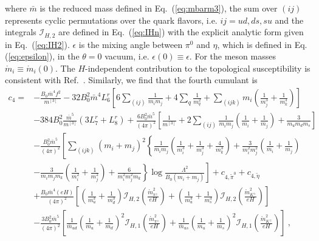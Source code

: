 \documentclass[12pt]{elsarticle}
\begin{document}
where $\bar{m}$ is the reduced mass defined in Eq.~(\ref{eq:mbarm3}), the sum over $(ij)$ represents cyclic permutations over the quark flavors, i.e. $ij=ud,ds,su$ and the integrals $\mathcal{I}_{H,2}$ are defined in Eq.~(\ref{eq:IHn}) with the explicit analytic form given in Eq.~(\ref{eq:IH2}). $\epsilon$ is the mixing angle between $\pi^{0}$ and $\eta$, which is defined in Eq. (\ref{eq:epsilon}), in the $\theta=0$ vacuum, i.e. $\epsilon(0)\equiv\epsilon$. For the meson masses $\mathring{m}_{i}\equiv\mathring{m}_{i}(0)$. The $H$-independent contribution to the topological susceptibility is consistent with Ref.~\cite{Bernard:2012fw}. Similarly, we find that the fourth cumulant is
\begin{equation}
\begin{split}
\label{eq:c4}
c_{4}=&-\frac{B_{0}\bar{m}^{4}f^{2}}{m^{[3]}}-32B_{0}^{2}\bar{m}^{4}L^{r}_{6}\left[6\sum_{(ij)}\frac{1}{m_{i}m_{j}}+4\sum_{q}\frac{1}{m_{q}^{2}}+\sum_{(ijk)}m_{i}\left(\frac{1}{m_{j}^{3}}+\frac{1}{m_{k}^{3}}\right)\right]\\
&-384B_{0}^{2}\frac{\bar{m}^{5}}{m^{[3]}}(3L^{r}_{7}+L^{r}_{8})+\frac{6B_{0}^{2}\bar{m}^{5}}{(4\pi)^{2}}\left[\frac{1}{m^{[3]}}+2\sum_{(ij)}\frac{1}{m_{i}m_{j}}\left(\frac{1}{m_{i}}+\frac{1}{m_{j}}\right)+\frac{3}{m_{u}m_{d}m_{s}}\right]\\
&-\frac{B_{0}^{2}\bar{m}^{5}}{(4\pi)^{2}}\left[\sum_{(ijk)}(m_{i}+m_{j})^{2}\left\{\frac{1}{m_{i}m_{j}}\left(\frac{1}{m_{i}^{3}}+\frac{1}{m_{j}^{3}}+\frac{4}{m_{k}^{3}}\right)+\frac{3}{m_{i}^{2}m_{j}^{2}}\left(\frac{1}{m_{i}}+\frac{1}{m_{j}}\right)\right.\right.\\
&\left.\left.-\frac{3}{m_{i}m_{j}m_{k}}\left(\frac{1}{m_{i}^{2}}+\frac{1}{m_{j}^{2}}\right)+\frac{6}{m_{i}^{2}m_{j}^{2}m_{k}}\right\}\log\frac{\Lambda^{2}}{B_{0}(m_{i}+m_{j})}\right ]+c_{4,\tilde{\pi}^{0}}+c_{4,\tilde{\eta}}\\
&+\frac{B_{0}\bar{m}^{4}(eH)}{(4\pi)^{2}}\left[\left(\frac{1}{m_{u}^{3}}+\frac{1}{m_{d}^{3}}\right)\mathcal{I}_{H,2}(\tfrac{\mathring{m}_{\pi^{\pm}}^{2}}{eH})+\left(\frac{1}{m_{u}^{3}}+\frac{1}{m_{s}^{3}}\right)\mathcal{I}_{H,2}(\tfrac{\mathring{m}_{K^{\pm}}^{2}}{eH})\right]\\
&-\frac{3B_{0}^{2}\bar{m}^{5}}{(4\pi)^{2}}\left[\frac{1}{\bar{m}_{ud}}\left(\frac{1}{m_{u}}+\frac{1}{m_{d}}\right)^{2}\mathcal{I}_{H,1}(\tfrac{\mathring{m}_{\pi^{\pm}}^{2}}{eH})+\frac{1}{\bar{m}_{us}}\left(\frac{1}{m_{u}}+\frac{1}{m_{s}}\right)^{2}\mathcal{I}_{H,1}(\tfrac{\mathring{m}_{K^{\pm}}^{2}}{eH})\right]\ ,
\end{split}
\end{equation}
\end{document}
